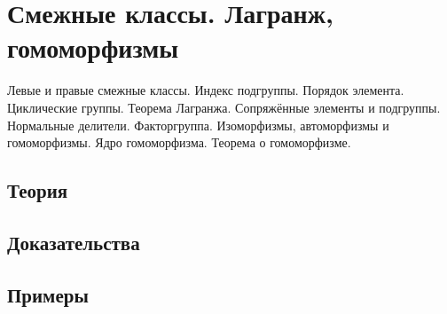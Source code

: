 
\section{Смежные классы. Лагранж, гомоморфизмы}
\label{sec:2.2.12-cosets-quotients}

\begin{ticket}
Левые и правые смежные классы. Индекс подгруппы. Порядок элемента. Циклические группы. Теорема Лагранжа. Сопряжённые элементы и подгруппы. Нормальные делители. Факторгруппа. Изоморфизмы, автоморфизмы и гомоморфизмы. Ядро гомоморфизма. Теорема о гомоморфизме.
\end{ticket}

\subsection*{Теория}

\subsection*{Доказательства}

\subsection*{Примеры}
